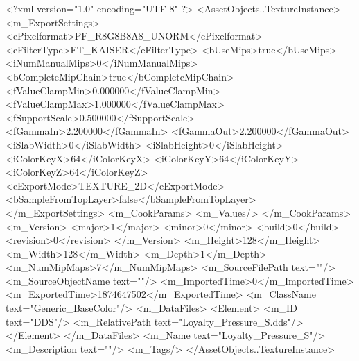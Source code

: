 <?xml version="1.0" encoding="UTF-8" ?>
<AssetObjects..TextureInstance>
	<m_ExportSettings>
		<ePixelformat>PF_R8G8B8A8_UNORM</ePixelformat>
		<eFilterType>FT_KAISER</eFilterType>
		<bUseMips>true</bUseMips>
		<iNumManualMips>0</iNumManualMips>
		<bCompleteMipChain>true</bCompleteMipChain>
		<fValueClampMin>0.000000</fValueClampMin>
		<fValueClampMax>1.000000</fValueClampMax>
		<fSupportScale>0.500000</fSupportScale>
		<fGammaIn>2.200000</fGammaIn>
		<fGammaOut>2.200000</fGammaOut>
		<iSlabWidth>0</iSlabWidth>
		<iSlabHeight>0</iSlabHeight>
		<iColorKeyX>64</iColorKeyX>
		<iColorKeyY>64</iColorKeyY>
		<iColorKeyZ>64</iColorKeyZ>
		<eExportMode>TEXTURE_2D</eExportMode>
		<bSampleFromTopLayer>false</bSampleFromTopLayer>
	</m_ExportSettings>
	<m_CookParams>
		<m_Values/>
	</m_CookParams>
	<m_Version>
		<major>1</major>
		<minor>0</minor>
		<build>0</build>
		<revision>0</revision>
	</m_Version>
	<m_Height>128</m_Height>
	<m_Width>128</m_Width>
	<m_Depth>1</m_Depth>
	<m_NumMipMaps>7</m_NumMipMaps>
	<m_SourceFilePath text=""/>
	<m_SourceObjectName text=""/>
	<m_ImportedTime>0</m_ImportedTime>
	<m_ExportedTime>1874647502</m_ExportedTime>
	<m_ClassName text="Generic_BaseColor"/>
	<m_DataFiles>
		<Element>
			<m_ID text="DDS"/>
			<m_RelativePath text="Loyalty_Pressure_{S}.dds"/>
		</Element>
	</m_DataFiles>
	<m_Name text="Loyalty_Pressure_{S}"/>
	<m_Description text=""/>
	<m_Tags/>
</AssetObjects..TextureInstance>

